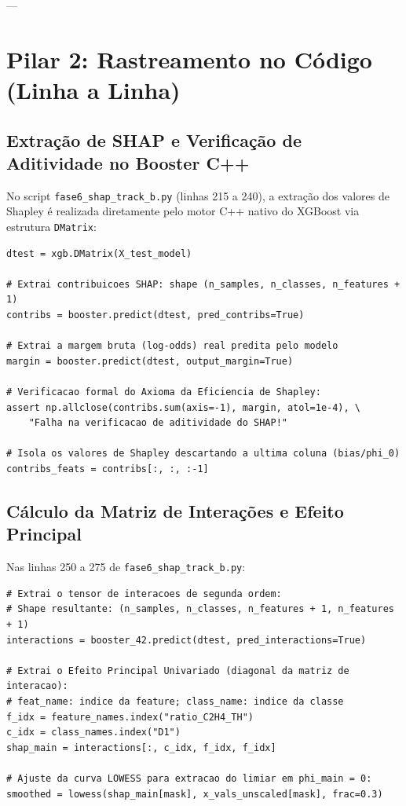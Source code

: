 \documentclass[11pt,a4paper]{article}
\begin{document}
---

\section{Pilar 2: Rastreamento no Código (Linha a Linha)}

\subsection{Extração de SHAP e Verificação de Aditividade no Booster C++}

No script \texttt{fase6\_shap\_track\_b.py} (linhas 215 a 240), a extração dos valores de Shapley é realizada diretamente pelo motor C++ nativo do XGBoost via estrutura \texttt{DMatrix}:

\begin{lstlisting}
dtest = xgb.DMatrix(X_test_model)

# Extrai contribuicoes SHAP: shape (n_samples, n_classes, n_features + 1)
contribs = booster.predict(dtest, pred_contribs=True)

# Extrai a margem bruta (log-odds) real predita pelo modelo
margin = booster.predict(dtest, output_margin=True)

# Verificacao formal do Axioma da Eficiencia de Shapley:
assert np.allclose(contribs.sum(axis=-1), margin, atol=1e-4), \
    "Falha na verificacao de aditividade do SHAP!"

# Isola os valores de Shapley descartando a ultima coluna (bias/phi_0)
contribs_feats = contribs[:, :, :-1]
\end{lstlisting}

\subsection{Cálculo da Matriz de Interações e Efeito Principal}

Nas linhas 250 a 275 de \texttt{fase6\_shap\_track\_b.py}:

\begin{lstlisting}
# Extrai o tensor de interacoes de segunda ordem:
# Shape resultante: (n_samples, n_classes, n_features + 1, n_features + 1)
interactions = booster_42.predict(dtest, pred_interactions=True)

# Extrai o Efeito Principal Univariado (diagonal da matriz de interacao):
# feat_name: indice da feature; class_name: indice da classe
f_idx = feature_names.index("ratio_C2H4_TH")
c_idx = class_names.index("D1")
shap_main = interactions[:, c_idx, f_idx, f_idx]

# Ajuste da curva LOWESS para extracao do limiar em phi_main = 0:
smoothed = lowess(shap_main[mask], x_vals_unscaled[mask], frac=0.3)
\end{lstlisting}
\end{document}
